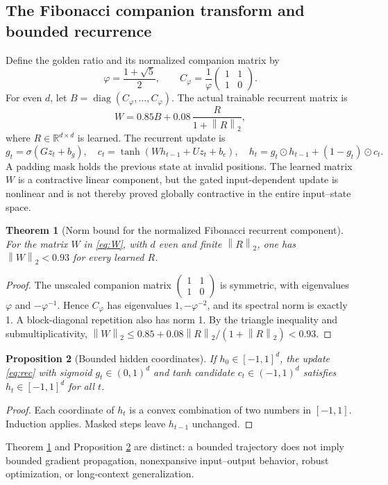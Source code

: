 \documentclass[11pt,a4paper]{article}
\theoremstyle{plain}\newtheorem{theorem}{Theorem}[section]\newtheorem{proposition}[theorem]{Proposition}\newtheorem{lemma}[theorem]{Lemma}
\theoremstyle{definition}\newtheorem{definition}[theorem]{Definition}\newtheorem{remark}[theorem]{Remark}\newtheorem{counterexample}[theorem]{Counterexample}
\newcommand{\R}{\mathbb R}\newcommand{\C}{\mathbb C}\newcommand{\Z}{\mathbb Z}\newcommand{\EE}{\mathbb E}\newcommand{\norm}[1]{\left\lVert #1\right\rVert}\newcommand{\tr}{\operatorname{tr}}\newcommand{\rank}{\operatorname{rank}}\newcommand{\diag}{\operatorname{diag}}\newcommand{\softmax}{\operatorname{softmax}}\newcommand{\Span}{\operatorname{span}}\newcommand{\NOTE}{\textsc{Status:}}
\begin{document}
\subsection{The Fibonacci companion transform and bounded recurrence}
Define the golden ratio and its normalized companion matrix by
\begin{equation}\label{eq:fib}
 \varphi=\frac{1+\sqrt5}{2},\qquad
 C_\varphi=\frac1\varphi\begin{pmatrix}1&1\\1&0\end{pmatrix}.
\end{equation}
For even $d$, let $B=\operatorname{diag}(C_\varphi,\ldots,C_\varphi)$. The actual trainable recurrent matrix is
\begin{equation}\label{eq:W}
 W=0.85 B+0.08\,\frac{R}{1+\norm{R}_2},
\end{equation}
where $R\in\R^{d\times d}$ is learned. The recurrent update is
\begin{equation}\label{eq:rec}
 g_t=\sigma(Gz_t+b_g),\quad c_t=\tanh(W h_{t-1}+Uz_t+b_c),\quad h_t=g_t\odot h_{t-1}+(1-g_t)\odot c_t.
\end{equation}
A padding mask holds the previous state at invalid positions. The learned matrix $W$ is a contractive linear component, but the gated input-dependent update is nonlinear and is not thereby proved globally contractive in the entire input--state space.

\begin{theorem}[Norm bound for the normalized Fibonacci recurrent component]\label{th:op}
For the matrix $W$ in \eqref{eq:W}, with $d$ even and finite $\norm{R}_2$, one has $\norm{W}_2<0.93$ for every learned $R$.
\end{theorem}
\begin{proof}
The unscaled companion matrix $\left(\begin{smallmatrix}1&1\\1&0\end{smallmatrix}\right)$ is symmetric, with eigenvalues $\varphi$ and $-\varphi^{-1}$. Hence $C_\varphi$ has eigenvalues $1,-\varphi^{-2}$, and its spectral norm is exactly 1. A block-diagonal repetition also has norm 1. By the triangle inequality and submultiplicativity,
$\norm{W}_2\le0.85+0.08\norm{R}_2/(1+\norm{R}_2)<0.93$.
\end{proof}

\begin{proposition}[Bounded hidden coordinates]\label{prop:box}
If $h_0\in[-1,1]^d$, the update \eqref{eq:rec} with sigmoid $g_t\in(0,1)^d$ and tanh candidate $c_t\in(-1,1)^d$ satisfies $h_t\in[-1,1]^d$ for all $t$.
\end{proposition}
\begin{proof}
Each coordinate of $h_t$ is a convex combination of two numbers in $[-1,1]$. Induction applies. Masked steps leave $h_{t-1}$ unchanged.
\end{proof}
Theorem \ref{th:op} and Proposition \ref{prop:box} are distinct: a bounded trajectory does not imply bounded gradient propagation, nonexpansive input--output behavior, robust optimization, or long-context generalization.
\end{document}
